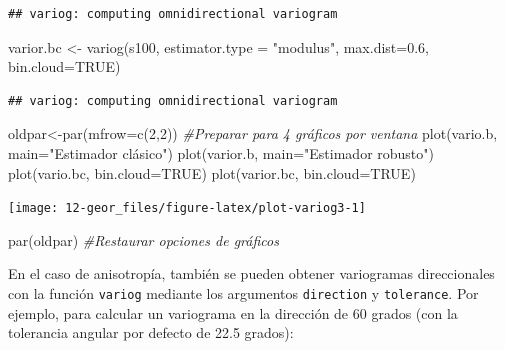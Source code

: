 \documentclass[
  spanish,
]{book}
\newenvironment{Shaded}{\begin{snugshade}}{\end{snugshade}}
\newcommand{\AttributeTok}[1]{\textcolor[rgb]{0.77,0.63,0.00}{#1}}
\newcommand{\CommentTok}[1]{\textcolor[rgb]{0.56,0.35,0.01}{\textit{#1}}}
\newcommand{\ConstantTok}[1]{\textcolor[rgb]{0.00,0.00,0.00}{#1}}
\newcommand{\DecValTok}[1]{\textcolor[rgb]{0.00,0.00,0.81}{#1}}
\newcommand{\FloatTok}[1]{\textcolor[rgb]{0.00,0.00,0.81}{#1}}
\newcommand{\FunctionTok}[1]{\textcolor[rgb]{0.00,0.00,0.00}{#1}}
\newcommand{\NormalTok}[1]{#1}
\newcommand{\OtherTok}[1]{\textcolor[rgb]{0.56,0.35,0.01}{#1}}
\newcommand{\StringTok}[1]{\textcolor[rgb]{0.31,0.60,0.02}{#1}}
\theoremstyle{break}
\begin{document}
\begin{verbatim}
## variog: computing omnidirectional variogram
\end{verbatim}

\begin{Shaded}
\begin{Highlighting}[]
\NormalTok{varior.bc }\OtherTok{\textless{}{-}} \FunctionTok{variog}\NormalTok{(s100, }\AttributeTok{estimator.type =} \StringTok{"modulus"}\NormalTok{, }\AttributeTok{max.dist=}\FloatTok{0.6}\NormalTok{, }\AttributeTok{bin.cloud=}\ConstantTok{TRUE}\NormalTok{)}
\end{Highlighting}
\end{Shaded}

\begin{verbatim}
## variog: computing omnidirectional variogram
\end{verbatim}

\begin{Shaded}
\begin{Highlighting}[]
\NormalTok{oldpar}\OtherTok{\textless{}{-}}\FunctionTok{par}\NormalTok{(}\AttributeTok{mfrow=}\FunctionTok{c}\NormalTok{(}\DecValTok{2}\NormalTok{,}\DecValTok{2}\NormalTok{)) }\CommentTok{\#Preparar para 4 gráficos por ventana}
\FunctionTok{plot}\NormalTok{(vario.b, }\AttributeTok{main=}\StringTok{"Estimador clásico"}\NormalTok{)}
\FunctionTok{plot}\NormalTok{(varior.b, }\AttributeTok{main=}\StringTok{"Estimador robusto"}\NormalTok{)}
\FunctionTok{plot}\NormalTok{(vario.bc, }\AttributeTok{bin.cloud=}\ConstantTok{TRUE}\NormalTok{)}
\FunctionTok{plot}\NormalTok{(varior.bc, }\AttributeTok{bin.cloud=}\ConstantTok{TRUE}\NormalTok{)}
\end{Highlighting}
\end{Shaded}

\begin{center}\texttt{[image: 12-geor\_files/figure-latex/plot-variog3-1]} \end{center}

\begin{Shaded}
\begin{Highlighting}[]
\FunctionTok{par}\NormalTok{(oldpar) }\CommentTok{\#Restaurar opciones de gráficos}
\end{Highlighting}
\end{Shaded}

En el caso de anisotropía, también se pueden obtener variogramas direccionales con la función
\texttt{variog} mediante los argumentos \texttt{direction} y \texttt{tolerance}. Por ejemplo,
para calcular un variograma en la dirección de 60 grados (con la
tolerancia angular por defecto de 22.5 grados):
\end{document}
